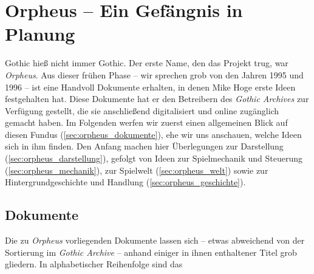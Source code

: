 \documentclass[a5paper,pagesize,numbers=noenddot]{scrbook}
\begin{document}
\chapter{Orpheus -- Ein Gefängnis in Planung}\label{ch:orpheus}
Gothic hieß nicht immer Gothic.
Der erste Name, den das Projekt trug, war \textit{Orpheus}. %
Aus dieser frühen Phase -- wir sprechen grob von den Jahren 1995 und 1996 -- ist eine Handvoll Dokumente erhalten, in denen Mike Hoge erste Ideen festgehalten hat.
Diese Dokumente hat er den Betreibern des \textit{Gothic Archives} zur Verfügung gestellt, die sie anschließend digitalisiert und online zugänglich gemacht haben.\autocite[Vgl.][]{archive_orpheus_2024}
Im Folgenden werfen wir zuerst einen allgemeinen Blick auf diesen Fundus (\autoref{sec:orpheus_dokumente}), ehe wir uns anschauen, welche Ideen sich in ihm finden.
Den Anfang machen hier Überlegungen zur Darstellung (\autoref{sec:orpheus_darstellung}), gefolgt von Ideen zur Spielmechanik und Steuerung (\autoref{sec:orpheus_mechanik}), zur Spielwelt (\autoref{sec:orpheus_welt}) sowie zur Hintergrundgeschichte und Handlung (\autoref{sec:orpheus_geschichte}).


\section{Dokumente}\label{sec:orpheus_dokumente}
Die zu \textit{Orpheus} vorliegenden Dokumente lassen sich -- etwas abweichend von der Sortierung im \textit{Gothic Archive} -- anhand einiger in ihnen enthaltener Titel grob gliedern.
In alphabetischer Reihenfolge sind das
\end{document}
